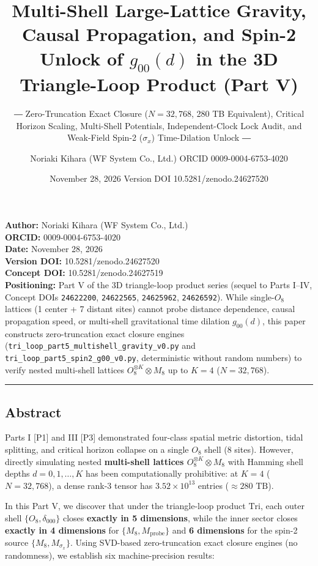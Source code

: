 \documentclass[
  a4paper,
]{article}
\title{Multi-Shell Large-Lattice Gravity, Causal Propagation, and Spin-2
Unlock of \(g_{00}(d)\) in the 3D Triangle-Loop Product (Part V)}
\subtitle{― Zero-Truncation Exact Closure (\(N = 32{,}768\), 280 TB
Equivalent), Critical Horizon Scaling, Multi-Shell Potentials,
Independent-Clock Lock Audit, and Weak-Field Spin-2 (\(\sigma_x\))
Time-Dilation Unlock ―}
\author{Noriaki Kihara (WF System Co., Ltd.) ORCID 0009-0004-6753-4020}
\date{November 28, 2026 Version DOI 10.5281/zenodo.24627520}
\begin{document}
\maketitle

{
\setcounter{tocdepth}{2}
\tableofcontents
}
\textbf{Author:} Noriaki Kihara (WF System Co., Ltd.)\\
\textbf{ORCID:} 0009-0004-6753-4020\\
\textbf{Date:} November 28, 2026\\
\textbf{Version DOI:} 10.5281/zenodo.24627520\\
\textbf{Concept DOI:} 10.5281/zenodo.24627519\\
\textbf{Positioning:} Part V of the 3D triangle-loop product series
(sequel to Parts I--IV, Concept DOIs \texttt{24622200},
\texttt{24622565}, \texttt{24625962}, \texttt{24626592}). While
single-\(O_8\) lattices (1 center + 7 distant sites) cannot probe
distance dependence, causal propagation speed, or multi-shell
gravitational time dilation \(g_{00}(d)\), this paper constructs
zero-truncation exact closure engines
(\texttt{tri\_loop\_part5\_multishell\_gravity\_v0.py} and
\texttt{tri\_loop\_part5\_spin2\_g00\_v0.py}, deterministic without
random numbers) to verify nested multi-shell lattices
\(O_8^{\otimes K} \otimes M_8\) up to \(K = 4\) (\(N = 32{,}768\)).

\begin{center}\rule{0.5\linewidth}{0.5pt}\end{center}

\subsection{Abstract}\label{abstract}

Parts I {[}P1{]} and III {[}P3{]} demonstrated four-class spatial metric
distortion, tidal splitting, and critical horizon collapse on a single
\(O_8\) shell (8 sites). However, directly simulating nested
\textbf{multi-shell lattices \(O_8^{\otimes K} \otimes M_8\)} with
Hamming shell depths \(d = 0, 1, \dots, K\) has been computationally
prohibitive: at \(K = 4\) (\(N = 32{,}768\)), a dense rank-3 tensor has
\(3.52 \times 10^{13}\) entries (\(\approx 280\text{ TB}\)).

In this Part V, we discover that under the triangle-loop product
\(\mathrm{Tri}\), each outer shell \(\{O_8, \delta_{000}\}\) closes
\textbf{exactly in 5 dimensions}, while the inner sector closes
\textbf{exactly in 4 dimensions} for \(\{M_8, M_{\mathrm{probe}}\}\) and
\textbf{6 dimensions} for the spin-2 source \(\{M_8, M_{\sigma_x}\}\).
Using SVD-based zero-truncation exact closure engines (no randomness),
we establish six machine-precision results:
\end{document}
